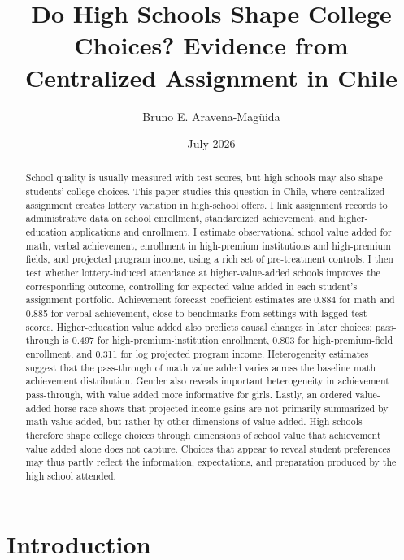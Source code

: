 \documentclass[a4paper, article, english, oneside, unknownkeysallowed, 12pt]{memoir}
\title{Do High Schools Shape College Choices? Evidence from Centralized Assignment in Chile}
\author{ Bruno E. Aravena-Magüida}
\date{July 2026}
\begin{document}
\maketitle

\begin{abstract}
School quality is usually measured with test scores, but high schools may also shape students' college choices.
This paper studies this question in Chile, where centralized assignment creates lottery variation in high-school offers.
I link assignment records to administrative data on school enrollment, standardized achievement, and higher-education applications and enrollment.
I estimate observational school value added for math, verbal achievement, enrollment in high-premium institutions and high-premium fields, and projected program income, using a rich set of pre-treatment controls.
I then test whether lottery-induced attendance at higher-value-added schools improves the corresponding outcome, controlling for expected value added in each student's assignment portfolio.
Achievement forecast coefficient estimates are 0.884 for math and 0.885 for verbal achievement, close to benchmarks from settings with lagged test scores.
Higher-education value added also predicts causal changes in later choices: pass-through is 0.497 for high-premium-institution enrollment, 0.803 for high-premium-field enrollment, and 0.311 for log projected program income.
Heterogeneity estimates suggest that the pass-through of math value added varies across the baseline math achievement distribution.
Gender also reveals important heterogeneity in achievement pass-through, with value added more informative for girls.
Lastly, an ordered value-added horse race shows that projected-income gains are not primarily summarized by math value added, but rather by other dimensions of value added.
High schools therefore shape college choices through dimensions of school value that achievement value added alone does not capture.
Choices that appear to reveal student preferences may thus partly reflect the information, expectations, and preparation produced by the high school attended.
\end{abstract}

\setcounter{tocdepth}{2}
\renewcommand\contentsname{}

\clearpage
\section{Introduction}
\end{document}
